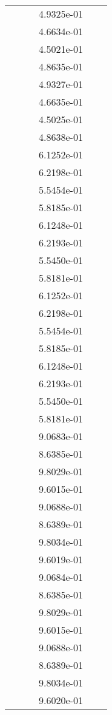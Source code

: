 \begin{xltabular}{\textwidth}{r|rS[table-format=1.3e+2]S[table-format=1.4e+2]S[table-format=1.4e+2]S[table-format=-1.5]}
&  &  & 4.9325e-01 & & \\
&  &  & 4.6634e-01 & & \\
&  &  & 4.5021e-01 & & \\
&  &  & 4.8635e-01 & & \\
&  &  & 4.9327e-01 & & \\
&  &  & 4.6635e-01 & & \\
&  &  & 4.5025e-01 & & \\
&  &  & 4.8638e-01 & & \\
&  &  & 6.1252e-01 & & \\
&  &  & 6.2198e-01 & & \\
&  &  & 5.5454e-01 & & \\
&  &  & 5.8185e-01 & & \\
&  &  & 6.1248e-01 & & \\
&  &  & 6.2193e-01 & & \\
&  &  & 5.5450e-01 & & \\
&  &  & 5.8181e-01 & & \\
&  &  & 6.1252e-01 & & \\
&  &  & 6.2198e-01 & & \\
&  &  & 5.5454e-01 & & \\
&  &  & 5.8185e-01 & & \\
&  &  & 6.1248e-01 & & \\
&  &  & 6.2193e-01 & & \\
&  &  & 5.5450e-01 & & \\
&  &  & 5.8181e-01 & & \\
&  &  & 9.0683e-01 & & \\
&  &  & 8.6385e-01 & & \\
&  &  & 9.8029e-01 & & \\
&  &  & 9.6015e-01 & & \\
&  &  & 9.0688e-01 & & \\
&  &  & 8.6389e-01 & & \\
&  &  & 9.8034e-01 & & \\
&  &  & 9.6019e-01 & & \\
&  &  & 9.0684e-01 & & \\
&  &  & 8.6385e-01 & & \\
&  &  & 9.8029e-01 & & \\
&  &  & 9.6015e-01 & & \\
&  &  & 9.0688e-01 & & \\
&  &  & 8.6389e-01 & & \\
&  &  & 9.8034e-01 & & \\
&  &  & 9.6020e-01 & & \\

\end{xltabular}

